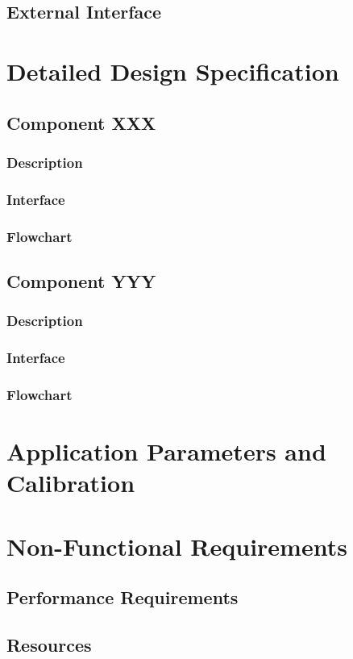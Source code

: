 \documentclass[11pt,letterpaper]{report}
\begin{document}
\section{External Interface}


\chapter{Detailed Design Specification}
\section{Component XXX}
\subsection{Description}
\subsection{Interface}
\subsection{Flowchart}

\section{Component YYY}
\subsection{Description}
\subsection{Interface}
\subsection{Flowchart}

\chapter{Application Parameters and Calibration}
\chapter{Non-Functional Requirements}
\section{Performance Requirements}
\section{Resources}
\end{document}
